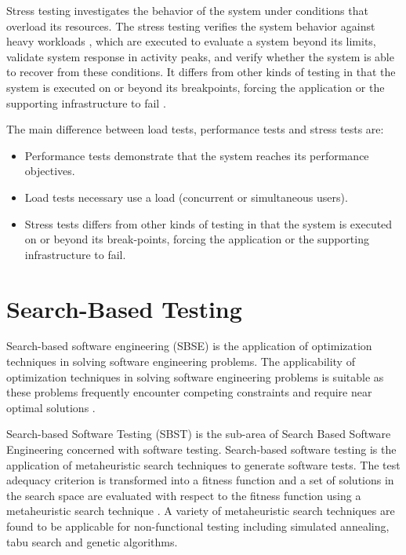 \documentclass[espaco=umemeio,chapter=TITLE,twoside,openright]{abnt}
\begin{document}
Stress testing investigates the behavior of the system under conditions
that overload its resources. The stress testing verifies the system behavior against heavy workloads \cite{Sandler2004} \cite{Lewis2005}, which are executed to evaluate a system beyond its limits, validate system response in activity peaks, and verify whether the system is able to recover from these conditions. It differs from other kinds of testing in that the system is executed on or beyond its breakpoints, forcing the application or the supporting infrastructure to fail \cite{DiLucca2006} \cite{Molyneaux2009}.

The main difference between load tests, performance tests and stress tests are:

\begin{itemize}

\item Performance tests demonstrate that the system reaches its performance objectives.
\item Load tests necessary use a load (concurrent or simultaneous users).
\item Stress tests differs from other kinds of testing in that the system is executed on or beyond its break-points, forcing the application or the supporting infrastructure to fail.
\end{itemize}


\section{Search-Based Testing}

Search-based software engineering (SBSE) is the application of optimization techniques in solving software engineering problems. The applicability of optimization techniques in solving software engineering problems is suitable as these problems frequently encounter competing constraints and require near optimal solutions \cite{Afzal2009a} \cite{Harman2015}.


Search-based Software Testing (SBST) is the sub-area of Search Based Software Engineering concerned with software testing. Search-based software testing is the application of metaheuristic search techniques to generate software tests. The test adequacy criterion is transformed into a fitness function and a set of solutions in the search space are evaluated with respect to the fitness function using a metaheuristic search technique \cite{Afzal2009a} \cite{Aleti2016} \cite{Harman2015}. A variety of metaheuristic search techniques are found to be applicable for non-functional testing including simulated annealing, tabu search and genetic algorithms.
\end{document}
